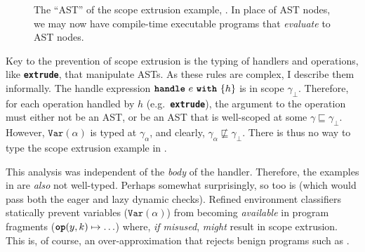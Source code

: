 \begin{figure}

\caption{The ``AST'' of the scope extrusion example, . In place of AST nodes, we may now have compile-time executable programs that \textit{evaluate} to AST nodes.}%
\label{fig:classifier-ast-scope-extrusion}
\end{figure}

Key to the prevention of scope extrusion is the typing of handlers and operations, like \textbf{\texttt{extrude}}, that manipulate ASTs. As these rules are complex, I describe them informally. The handle expression $\textbf{\texttt{handle}} \,\, {e} \,\, \textbf{\texttt{with}} \,\, \{{h}\}$ is in scope $\gamma_{\bot}$. Therefore, for each operation handled by $h$ (e.g.\ \textbf{\texttt{extrude}}), the argument to the operation must either not be an AST, or be an AST that is well-scoped at some $\gamma \sqsubseteq \gamma_{\bot}$. 
However, $\texttt{Var}(\alpha)$ is typed at $\gamma_{\alpha}$, and clearly, $\gamma_{\alpha} \not\sqsubseteq \gamma_{\bot}$. There is thus no way to type the scope extrusion example in .

This analysis was independent of the \textit{body} of the handler. Therefore, the examples in  are \textit{also} not well-typed. Perhaps somewhat surprisingly, so too is  (which would pass both the eager and lazy dynamic checks). Refined environment classifiers statically prevent variables ($\texttt{Var}(\alpha)$) from becoming \textit{available} in program fragments ($\texttt{\textbf{op}}(y, k) \mapsto \ldots$) where, \textit{if misused}, \textit{might} result in scope extrusion. This is, of course, an over-approximation that rejects benign programs such as .

